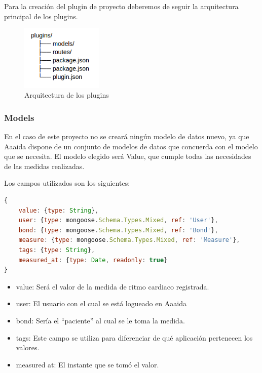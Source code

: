 Para la creación del plugin de proyecto deberemos de seguir la arquitectura principal de los plugins.


\begin{figure}[htb]
\begin{center}
\includegraphics[width=0.35\textwidth]{./setup/arc}
\caption{Arquitectura de los plugins}
\end{center}
\end{figure}

\subsubsection{Models}

En el caso de este proyecto no se creará ningún modelo de datos nuevo, ya que Aaaida dispone de un conjunto de modelos de datos que concuerda con el modelo que se necesita. El modelo elegido será Value, que cumple todas las necesidades de las medidas realizadas.

Los campos utilizados son los siguientes:

\begin{lstlisting}[language=JavaScript]
{
    value: {type: String},
    user: {type: mongoose.Schema.Types.Mixed, ref: 'User'},
    bond: {type: mongoose.Schema.Types.Mixed, ref: 'Bond'},
    measure: {type: mongoose.Schema.Types.Mixed, ref: 'Measure'},
    tags: {type: String},
    measured_at: {type: Date, readonly: true}
}
\end{lstlisting}
\pagebreak

\begin{itemize}
\item value: Será el valor de la medida de ritmo cardiaco registrada. 
\item user: El usuario con el cual se está logueado en Aaaida
\item bond: Sería el “paciente” al cual se le toma la medida.
\item tags: Este campo se utiliza para diferenciar de qué aplicación pertenecen los valores.  
\item measured at: El instante que se tomó el valor. 
\end{itemize}

